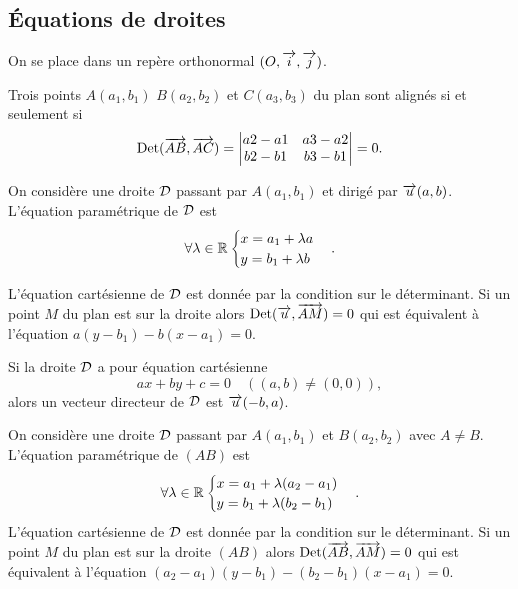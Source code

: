 \subsection{Équations de droites}

On se place dans un repère orthonormal \((O , \overrightarrow{i} , \overrightarrow{j})\).
\begin{prop}
  Trois points \(A(a_1, b_1)\) \(B(a_2, b_2)\) et \(C(a_3, b_3)\) du plan sont 
  alignés si et seulement si
  \begin{equation}
    \operatorname{Det}(\overrightarrow{AB},\overrightarrow{AC})=
    \begin{vmatrix}
      a2 - a1&a3 - a2\\
      b2 - b1&b3 - b1
    \end{vmatrix} =0.
  \end{equation}
\end{prop}

\begin{prop}
  On considère une droite \(\mathcal{D}\) passant par \(A(a_1 , b_1)\) et dirigé par 
  \(\overrightarrow{u}(a , b)\). L'équation paramétrique de \(\mathcal{D}\) est
  \begin{equation}
    \forall \lambda \in \mathbb{R} \begin{cases} x = a_1 + \lambda a \\ y = b_1+ 
    \lambda b\end{cases}.
  \end{equation}

  L'équation cartésienne de \(\mathcal{D}\) est donnée par la condition sur le 
  déterminant. Si un point \(M\) du plan est sur la droite alors \(\operatorname{Det}(\overrightarrow{u} , 
  \overrightarrow{AM}) = 0\) qui est équivalent à l'équation \(a(y - b_1)-b(x - a_1) = 
  0\).
\end{prop}

Si la droite \(\mathcal{D}\) a pour équation cartésienne
\begin{equation}
  ax + by + c = 0 \quad ((a , b) \neq (0 , 0)),
\end{equation}
alors un vecteur directeur de \(\mathcal{D}\) est \(\overrightarrow{u}(-b , a)\).

\begin{prop}
  On considère une droite \(\mathcal{D}\) passant par \(A(a_1 , b_1)\) et \(B(a_2 , 
  b_2)\) avec \(A \neq B\). L'équation paramétrique de \((AB)\) est
  \begin{equation}
    \forall \lambda \in \mathbb{R} \begin{cases} x = a_1 + \lambda (a_2 - a_1) \\ y = 
    b_1+ \lambda (b_2 - b_1)\end{cases}.
  \end{equation}
  L'équation cartésienne de \(\mathcal{D}\) est donnée par la condition sur le 
  déterminant. Si un point \(M\) du plan est sur la droite \((AB)\) alors 
  \(\operatorname{Det}(\overrightarrow{AB},\overrightarrow{AM}) = 0\) qui est équivalent à l'équation \((a_2 - 
  a_1)(y - b_1)-(b_2 - b_1)(x - a_1) = 0\).
\end{prop}

